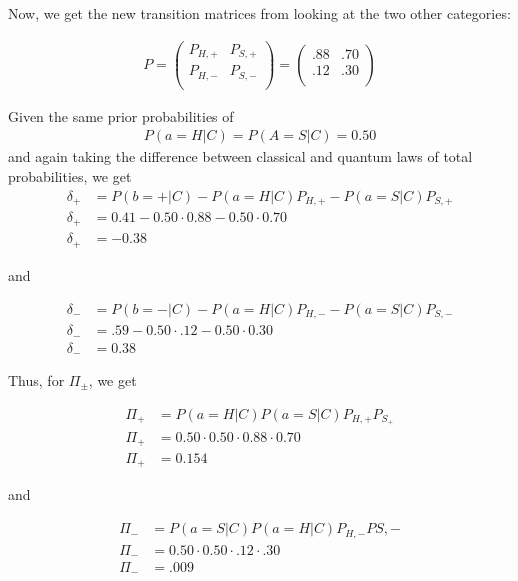 \documentclass[12pt]{article}
\begin{document}
	Now, we get the new transition matrices from looking at the two other categories:
	
		\begin{align}
	P =
	\left( \begin{array}{cc}
	P_{H, +} & P_{S, +} \\
	P_{H, -} & P_{S, -} \\
	\end{array}  \right)
	= 
	\left( \begin{array}{cc}
	.88 & .70 \\
	.12 & .30  \\
	\end{array} 
	\right)
	\end{align}
	
	Given the same prior probabilities of 
	\begin{align}
	P(a=H|C) = P(A=S|C) = 0.50
	\end{align}
	and again taking the difference between classical and quantum laws of total probabilities, we get
	\begin{align}
	\delta_{+} &= P(b=+|C) - P(a=H|C)P_{H, +} - P(a=S|C)P_{S, +} \\
	\delta_{+} &= 0.41 - 0.50 \cdot 0.88 - 0.50 \cdot 0.70 \\
	\delta_{+} &= -0.38
	\end{align}
	
	and
	
	\begin{align}
	\delta_{-} &= P(b=-|C) - P(a=H|C)P_{H, -} - P(a=S|C)P_{S, -} \\
	\delta_{-} &= .59 - 0.50 \cdot .12 - 0.50 \cdot 0.30 \\
	\delta_{-} &= 0.38
	\end{align}
	
	Thus, for $\Pi_\pm$, we get
	
	\begin{align}
	\Pi_{+} &= P(a=H|C)P(a=S|C)P_{H, +}P_{S_+}\\
	\Pi_{+} &= 0.50 \cdot 0.50 \cdot 0.88 \cdot 0.70\\
	\Pi_{+} &= 0.154
	\end{align}
	
	and 
	
	\begin{align}
	\Pi_- &= P(a = S|C)P(a=H|C)P_{H, -}P{S, -}\\
	\Pi_-&= 0.50 \cdot 0.50 \cdot .12 \cdot .30\\
	\Pi_-&= .009
	\end{align}
	
\end{document}
